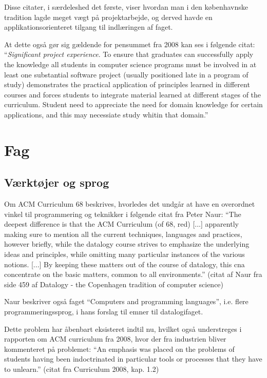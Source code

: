 \documentclass[10pt,a4paper]{article}
\begin{document}
Disse citater, i særdeleshed det første, viser hvordan man i den københavnske tradition lagde meget vægt på projektarbejde, og derved havde en applikationsorienteret tilgang til indlæringen af faget. %

At dette også gør sig gældende for pensummet fra 2008 kan ses i følgende citat:
``\emph{Significant project experience}. To ensure that graduates can successfully apply the knowledge all students in computer science programs must be involved in at least one substantial software project (usually positioned late in a program of study) demonstrates the practical application of principles learned in different courses and forces students to integrate material learned at different stages of the curriculum. Student need to appreciate the need for domain knowledge for certain applications, and this may necessiate study whitin that domain.''

\section{Fag}
\subsection{Værktøjer og sprog}
Om ACM Curriculum 68 beskrives, hvorledes det undgår at have en overordnet vinkel til programmering og teknikker i følgende citat fra Peter Naur:
``The deepest difference is that the ACM Curriculum (of 68, red) [...] apparently making sure to mention all the current techniques, languages and practices, however briefly, while the datalogy course strives to emphasize the underlying ideas and principles, while omitting many particular instances of the various notions. [...] By keeping these matters out of the course of datalogy, this cna concentrate on the basic matters, common to all environments.'' (citat af Naur fra side 459 af Datalogy - the Copenhagen tradition of computer science)

Naur beskriver også faget ``Computers and programming languages'', i.e. flere programmeringssprog, i hans forslag til emner til datalogifaget. 

Dette problem har åbenbart eksisteret indtil nu, hvilket også understreges i rapporten om ACM curriculum fra 2008, hvor der fra industrien bliver kommenteret på problemet: 
``An emphasis was placed on the problems of students having been indoctrinated in particular tools or processes that they have to unlearn.'' (citat fra Curriculum 2008, kap. 1.2)
\end{document}

